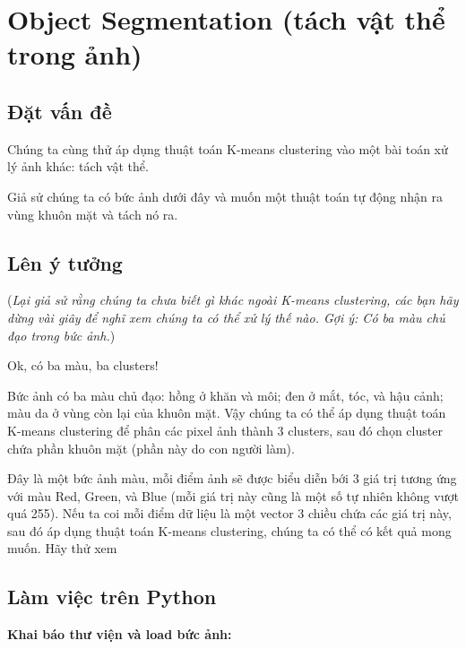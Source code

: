 \section{Object Segmentation (tách vật thể trong ảnh)}
 
\subsection{Đặt vấn đề}
Chúng ta cùng thử áp dụng thuật toán K-means clustering vào một bài toán xử lý ảnh khác: tách vật thể.  
 
Giả sử chúng ta có bức ảnh dưới đây và muốn một thuật toán tự động nhận ra vùng khuôn mặt và tách nó ra.  
 
 
 
\subsection{Lên ý tưởng  }
(\textit{Lại giả sử rằng chúng ta chưa biết gì khác ngoài K-means clustering, các bạn hãy dừng vài giây để nghĩ xem chúng ta có thể xử lý thế nào. Gợi ý: Có ba màu chủ đạo trong bức ảnh.}) 
 
Ok, có ba màu, ba clusters! 
 
Bức ảnh có ba màu chủ đạo: hồng ở khăn và môi; đen ở mắt, tóc, và hậu cảnh; màu da ở vùng còn lại của khuôn mặt. Vậy chúng ta có thể áp dụng thuật toán K-means clustering để phân các pixel ảnh thành 3 clusters, sau đó chọn cluster chứa phần khuôn mặt (phần này do con người làm). 
 
Đây là một bức ảnh màu, mỗi điểm ảnh sẽ được biểu diễn bới 3 giá trị tương ứng với màu Red, Green, và Blue (mỗi giá trị này cũng là một số tự nhiên không vượt quá 255). Nếu ta coi mỗi điểm dữ liệu là một vector 3 chiều chứa các giá trị này, sau đó áp dụng thuật toán K-means clustering, chúng ta có thể có kết quả mong muốn. Hãy thử xem 
 
 
 
\subsection{Làm việc trên Python}
 
\textbf{Khai báo thư viện và load bức ảnh:} 
 
